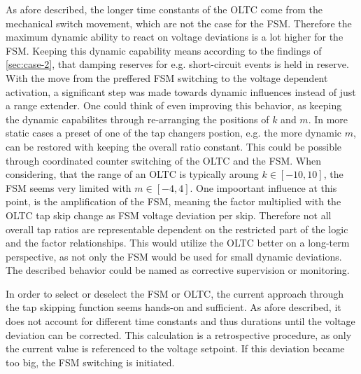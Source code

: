 As afore described, the longer time constants of the \acs{OLTC} come from the mechanical switch movement, which are not the case for the \acs{FSM}.
Therefore the maximum dynamic ability to react on voltage deviations is a lot higher for the \acs{FSM}.
Keeping this dynamic capability means according to the findings of \autoref{sec:case-2}, that damping reserves for e.g. short-circuit events is held in reserve.  
With the move from the preffered \acs{FSM} switching to the voltage dependent activation, a significant step was made towards dynamic influences instead of just a \glqq range extender\grqq.
One could think of even improving this behavior, as keeping the dynamic capabilites through re-arranging the positions of $k$ and $m$.
In more static cases a preset of one of the tap changers postion, e.g. the more dynamic $m$, can be restored with keeping the overall ratio constant.
This could be possible through coordinated counter switching of the \acs{OLTC} and the \acs{FSM}.
When considering, that the range of an \acs{OLTC} is typically aroung $k \in [-10,10]$, the FSM seems very limited with $m \in [-4,4]$.
One impoortant influence at this point, is the amplification of the \acs{FSM}, meaning the factor multiplied with the \acs{OLTC} tap skip change as \acs{FSM} voltage deviation per skip. 
Therefore not all overall tap ratios are representable dependent on the restricted part of the logic and the factor relationships.
This would utilize the \acs{OLTC} better on a long-term perspective, as not only the \acs{FSM} would be used for small dynamic deviations.
The described behavior could be named as corrective supervision or monitoring. 

In order to select or deselect the \acs{FSM} or \acs{OLTC}, the current approach through the tap skipping function seems hands-on and sufficient.
As afore described, it does not account for different time constants and thus durations until the voltage deviation can be corrected.
This calculation is a retrospective procedure, as only the current value is referenced to the voltage setpoint.
If this deviation became too big, the \acs{FSM} switching is initiated.

